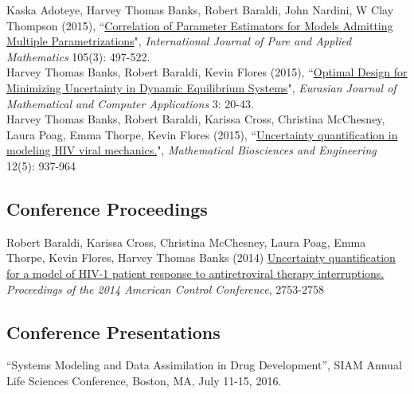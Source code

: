 \documentclass[10pt, a4paper]{article}
\newcommand{\years}[1]{\marginnote{\scriptsize #1}}
\begin{document}
\years{2015a}Kaska Adoteye, Harvey Thomas Banks, Robert Baraldi, John Nardini, W Clay Thompson (2015), “\href{http://www.ijpam.eu/contents/2015-105-3/16/16.pdf}{Correlation of Parameter Estimators for Models Admitting Multiple Parametrizations}", \emph{International Journal of Pure and Applied Mathematics} 105(3): 497-522.\\
\years{2015b}Harvey Thomas Banks, Robert Baraldi, Kevin Flores (2015), “\href{http://www.ncsu.edu/crsc/reports/ftp/pdf/crsc-tr15-03.pdf}{Optimal Design for Minimizing Uncertainty in Dynamic Equilibrium Systems}", \emph{Eurasian Journal of Mathematical and Computer Applications} 3: 20-43.\\
\years{2015c}Harvey Thomas Banks, Robert Baraldi, Karissa Cross, Christina McChesney, Laura Poag, Emma Thorpe, Kevin Flores (2015), “\href{http://aimsciences.org/journals/displayArticlesnew.jsp?paperID=11300}{Uncertainty quantification in modeling HIV viral mechanics.}", \emph{Mathematical Biosciences and Engineering} 12(5): 937-964\\

\subsection*{Conference Proceedings}
\noindent
\years{2014} Robert Baraldi, Karissa Cross, Christina McChesney, Laura Poag, Emma Thorpe, Kevin Flores, Harvey Thomas Banks (2014) \href{http://ieeexplore.ieee.org/stamp/stamp.jsp?tp=&arnumber=6858714&isnumber=6858556}{Uncertainty quantification for a model of HIV-1 patient response to antiretroviral therapy interruptions.} \emph{Proceedings of the 2014 American Control Conference}, 2753-2758\\

\subsection*{Conference Presentations}
\noindent
\noindent
\years{2016} “Systems Modeling and Data Assimilation in Drug Development”, SIAM Annual Life Sciences Conference, Boston, MA, July 11-15, 2016.\\
\end{document}
